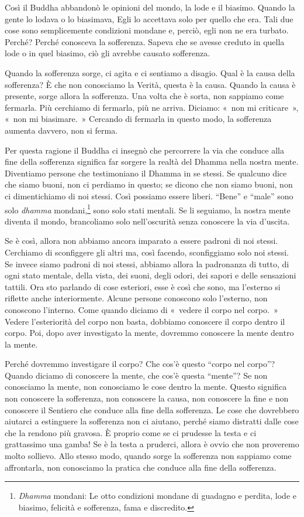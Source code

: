 Così il Buddha abbandonò le opinioni del mondo, la lode e il biasimo.
Quando la gente lo lodava o lo biasimava, Egli lo accettava solo per
quello che era. Tali due cose sono semplicemente condizioni mondane e,
perciò, egli non ne era turbato. Perché? Perché conosceva la sofferenza.
Sapeva che se avesse creduto in quella lode o in quel biasimo, ciò gli
avrebbe causato sofferenza.

Quando la sofferenza sorge, ci agita e ci sentiamo a disagio. Qual è la
causa della sofferenza? È che non conosciamo la Verità, questa è la
causa. Quando la causa è presente, sorge allora la sofferenza. Una volta
che è sorta, non sappiamo come fermarla. Più cerchiamo di fermarla, più
ne arriva. Diciamo: «~non mi criticare~», «~non mi biasimare.~» Cercando
di fermarla in questo modo, la sofferenza aumenta davvero, non si ferma.

Per questa ragione il Buddha ci insegnò che percorrere la via che
conduce alla fine della sofferenza significa far sorgere la realtà del
Dhamma nella nostra mente. Diventiamo persone che testimoniano il Dhamma
in se stessi. Se qualcuno dice che siamo buoni, non ci perdiamo in
questo; se dicono che non siamo buoni, non ci dimentichiamo di noi
stessi. Così possiamo essere liberi. ``Bene'' e ``male'' sono solo
\emph{dhamma} mondani,\footnote{\emph{Dhamma} mondani: Le otto
  condizioni mondane di guadagno e perdita, lode e biasimo, felicità e
  sofferenza, fama e discredito.} sono solo stati mentali. Se li
seguiamo, la nostra mente diventa il mondo, brancoliamo solo
nell'oscurità senza conoscere la via d'uscita.

Se è così, allora non abbiamo ancora imparato a essere padroni di noi
stessi. Cerchiamo di sconfiggere gli altri ma, così facendo,
sconfiggiamo solo noi stessi. Se invece siamo padroni di noi stessi,
abbiamo allora la padronanza di tutto, di ogni stato mentale, della
vista, dei suoni, degli odori, dei sapori e delle sensazioni tattili.
Ora sto parlando di cose esteriori, esse è così che sono, ma l'esterno
si riflette anche interiormente. Alcune persone conoscono solo
l'esterno, non conoscono l'interno. Come quando diciamo di «~vedere il
corpo nel corpo.~» Vedere l'esteriorità del corpo non basta, dobbiamo
conoscere il corpo dentro il corpo. Poi, dopo aver investigato la mente,
dovremmo conoscere la mente dentro la mente.

Perché dovremmo investigare il corpo? Che cos'è questo ``corpo nel
corpo''? Quando diciamo di conoscere la mente, che cos'è questa
``mente''? Se non conosciamo la mente, non conosciamo le cose dentro la
mente. Questo significa non conoscere la sofferenza, non conoscere la
causa, non conoscere la fine e non conoscere il Sentiero che conduce
alla fine della sofferenza. Le cose che dovrebbero aiutarci a estinguere
la sofferenza non ci aiutano, perché siamo distratti dalle cose che la
rendono più gravosa. È proprio come se ci prudesse la testa e ci
grattassimo una gamba! Se è la testa a pruderci, allora è ovvio che non
proveremo molto sollievo. Allo stesso modo, quando sorge la sofferenza
non sappiamo come affrontarla, non conosciamo la pratica che conduce
alla fine della sofferenza.

